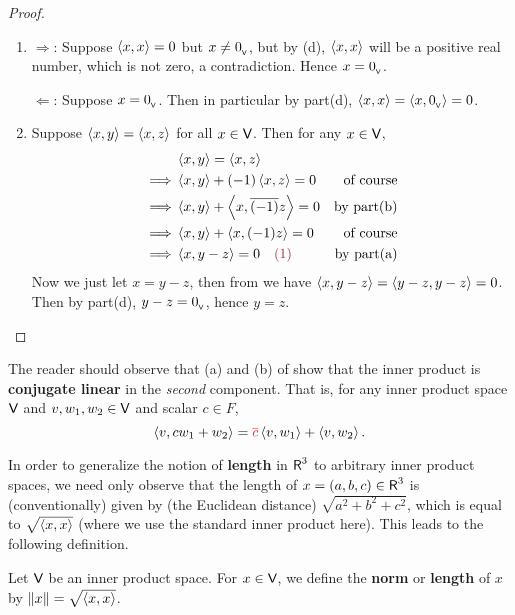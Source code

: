 \begin{proof}
\begin{enumerate}
\item
\(\Longrightarrow\): Suppose \(\left< x, x \right> = 0\) but \(x \ne 0_{_{\textsf{V}}}\), but by (d), \(\left< x, x \right>\) will be a positive real number, which is not zero, a contradiction.
Hence \(x = 0_{_{\textsf{V}}}\).

\(\Longleftarrow\): Suppose \(x = 0_{_{\textsf{V}}}\).
Then in particular by part(d), \(\left< x, x \right> = \left< x, 0_{_{\textsf{V}}} \right> = 0\).

\item Suppose \(\left< x, y \right> = \left< x, z \right>\) for all \(x \in \textsf{V}\).
Then for any \(x \in \textsf{V}\),
\begin{align*}
             & \LG x, y \RG = \LG x, z \RG \\
    \implies & \LG x, y \RG + (-1) \LG x, z \RG = 0 & \text{of course} \\
    \implies & \LG x, y \RG + \LG x, \conjugatet{(-1)} z \RG = 0 & \text{by part(b)} \\
    \implies & \LG x, y \RG + \LG x, (-1) z \RG = 0 & \text{of course} \\
    \implies & \LG x, y - z \RG = 0 \quad \MAROON{(1)} & \text{by part(a)} \\
\end{align*}
Now we just let \(x = y - z\), then from  we have \(\left< x, y - z \right> = \left< y - z, y - z \right> = 0\).
Then by part(d), \(y - z = 0_{_{\textsf{V}}}\), hence \(y = z\).
\end{enumerate}
\end{proof}

\begin{remark} \label{remark 6.1.9}
The reader should observe that (a) and (b) of  show that the inner product is \textbf{conjugate linear} in the \emph{second} component.
That is, for any inner product space \(\textsf{V}\) and \(v, w_1, w_2 \in \textsf{V}\) and scalar \(c \in F\),
\[
    \LG v, c w_1 + w_2 \RG = \RED{\conjugatet{c}} \LG v, w_1 \RG + \LG v, w_2 \RG.
\]
\end{remark}

In order to generalize the notion of \textbf{length} in \(\textsf{R}^3\) to arbitrary inner product spaces, we need only observe that the length of \(x = (a, b, c) \in \textsf{R}^3\) is (conventionally) given by (the Euclidean distance) \( \sqrt{a^2 + b^2 + c^2} \), which is equal to \(\sqrt{\left< x, x\right>}\) (where we use the standard inner product here).
This leads to the following definition.

\begin{definition} \label{def 6.3}
Let \(\textsf{V}\) be an inner product space.
For \(x \in \textsf{V}\), we define the \textbf{norm} or \textbf{length} of \(x\) by \(\left\lVert x\right\rVert = \sqrt{\left< x, x \right>}\).
\end{definition}

